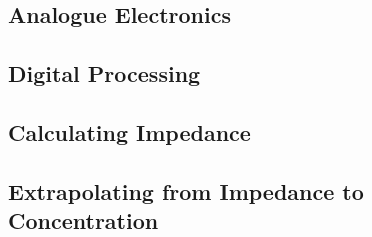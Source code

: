 \subsection{Analogue Electronics}

\subsection{Digital Processing}

\subsection{Calculating Impedance}



\subsection{Extrapolating from Impedance to Concentration}



